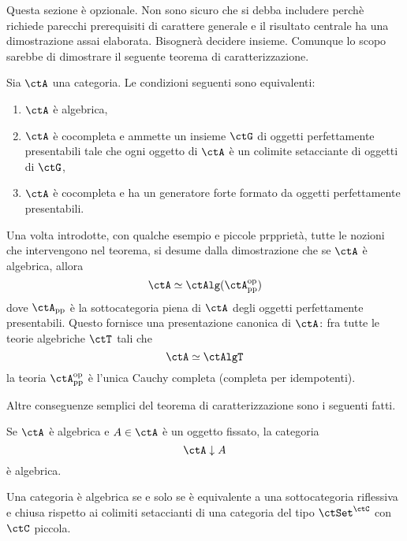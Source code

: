 \begin{warning}\label{caveat_sec_caract_AlgT}
	Questa sezione è opzionale. Non sono sicuro che si debba includere perchè richiede parecchi prerequisiti di carattere
	generale e il risultato centrale ha una dimostrazione assai elaborata. Bisognerà decidere insieme. Comunque lo scopo
	sarebbe di dimostrare il seguente teorema di caratterizzazione.
\end{warning}

\begin{theorem}\label{teo_caract_AlgT}
	Sia \(\ctA\) una categoria. Le condizioni seguenti sono equivalenti:
	\begin{enumerate}
		\item \(\ctA\) è algebrica,
		\item \(\ctA\) è cocompleta e ammette un insieme \(\ctG\) di oggetti perfettamente presentabili tale che ogni
		      oggetto di \(\ctA\) è un colimite setacciante di oggetti di \(\ctG\),
		\item \(\ctA\) è cocompleta e ha un generatore forte formato da oggetti perfettamente presentabili.
	\end{enumerate}
\end{theorem}

\begin{remark}\label{oss_pres_can}
	Una volta introdotte, con qualche esempio e piccole prpprietà, tutte le nozioni che intervengono nel teorema, si desume
	dalla dimostrazione che se \(\ctA\) è algebrica, allora
	\[
		\ctA \simeq \ctAlg(\ctA_{\mathrm{pp}}^{\mathrm{op}})
	\]
	dove \(\ctA_{\mathrm{pp}}\) è la sottocategoria piena di \(\ctA\) degli oggetti perfettamente presentabili. Questo fornisce
	una presentazione canonica di \(\ctA \colon\)fra tutte le teorie algebriche \(\ctT\) tali che
	\[
		\ctA \simeq \ctAlgT
	\]
	la teoria \(\ctA_{\mathrm{pp}}^{\mathrm{op}}\) è l'unica Cauchy completa (completa per idempotenti).
\end{remark}

Altre conseguenze semplici del teorema di caratterizzazione sono i seguenti fatti.

\begin{proposition}\label{prop_comma_alg}
	Se \(\ctA\) è algebrica e \(A \in \ctA\) è un oggetto fissato, la categoria
	\[
		\ctA \downarrow A
	\]
	è algebrica.
\end{proposition}

\begin{proposition}\label{prop_repr_aAlgT}
	Una categoria è algebrica se e solo se è equivalente a una sottocategoria riflessiva e chiusa rispetto ai colimiti setaccianti
	di una categoria del tipo \(\ctSet^{\ctC}\) con \(\ctC\) piccola.
\end{proposition}

